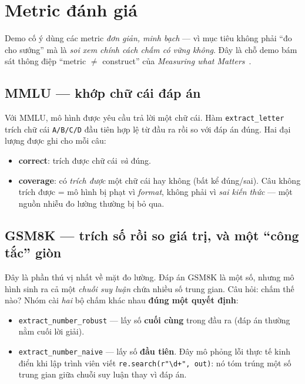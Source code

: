 \section{Metric đánh giá}
\label{sec:metrics}

Demo cố ý dùng các metric \emph{đơn giản, minh bạch} --- vì mục tiêu không phải
``đo cho sướng'' mà là \emph{soi xem chính cách chấm có vững không}. Đây là chỗ
demo bám sát thông điệp ``metric $\neq$ construct'' của
\emph{Measuring what Matters}~\cite{measuring_what_matters}.

\subsection{MMLU --- khớp chữ cái đáp án}

Với MMLU, mô hình được yêu cầu trả lời một chữ cái. Hàm \texttt{extract\_letter}
trích chữ cái \texttt{A/B/C/D} đầu tiên hợp lệ từ đầu ra rồi so với đáp án đúng.
Hai đại lượng được ghi cho mỗi câu:

\begin{itemize}
  \item \textbf{correct}: trích được chữ cái \emph{và} đúng.
  \item \textbf{coverage}: có \emph{trích được} một chữ cái hay không (bất kể
    đúng/sai). Câu không trích được = mô hình bị phạt vì \emph{format}, không phải
    vì \emph{sai kiến thức} --- một nguồn nhiễu đo lường thường bị bỏ qua.
\end{itemize}

\subsection{GSM8K --- trích số rồi so giá trị, và một ``công tắc'' giòn}

Đây là phần thú vị nhất về mặt đo lường. Đáp án GSM8K là một số, nhưng mô hình
sinh ra cả một \emph{chuỗi suy luận} chứa nhiều số trung gian. Câu hỏi: chấm thế
nào? Nhóm cài \emph{hai} bộ chấm khác nhau \textbf{đúng một quyết định}:

\begin{itemize}
  \item \texttt{extract\_number\_robust} --- lấy số \textbf{cuối cùng} trong đầu
    ra (đáp án thường nằm cuối lời giải).
  \item \texttt{extract\_number\_naive} --- lấy số \textbf{đầu tiên}. Đây mô phỏng
    lỗi thực tế kinh điển khi lập trình viên viết \verb|re.search(r"\d+", out)|:
    nó tóm trúng một số trung gian giữa chuỗi suy luận thay vì đáp án.
\end{itemize}

